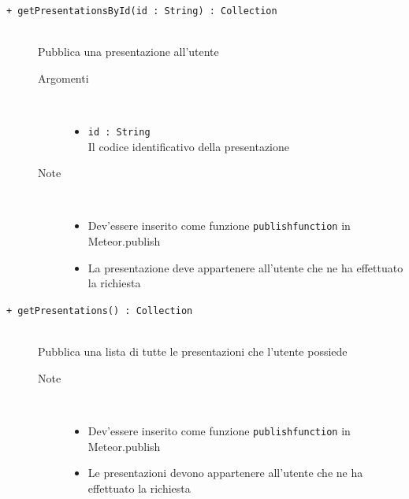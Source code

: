\begin{description}
	\begin{description}
		\item[\texttt{+ getPresentationsById(id : String) : Collection			}] \hfill \\
			Pubblica una presentazione all'utente
			
		\begin{description}
			\item[Argomenti] \hfill \\
				\begin{itemize}
				
					\item \texttt{id : String			} \hfill \\
					Il codice identificativo della presentazione
					
				\end{itemize}
			\item[Note] \hfill \\
			\begin{itemize}
					\item Dev'essere inserito come funzione \texttt{publishfunction} in Meteor.publish
					\item La presentazione deve appartenere all'utente che ne ha effettuato la richiesta
				\end{itemize}
		\end{description}
	\end{description}
	
	\begin{description}
		\item[\texttt{+ getPresentations() : Collection			}] \hfill \\
			Pubblica una lista di tutte le presentazioni che l'utente possiede
			
		\begin{description}
			
			\item[Note] \hfill \\
			\begin{itemize}
					\item Dev'essere inserito come funzione \texttt{publishfunction} in Meteor.publish
					\item Le presentazioni devono appartenere all'utente che ne ha effettuato la richiesta
				\end{itemize}
		\end{description}
	\end{description}
	

\end{description}
